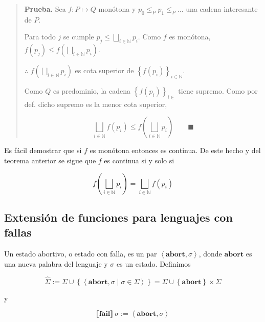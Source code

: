 \documentclass[article, 12pt]{article}
\begin{document}
\small
\begin{quote}

\textbf{Prueba.} Sea $f : P \mapsto Q$ monótona y $p_0 \leq_P p_1 \leq_P \ldots$
una cadena interesante de $P$.  

Para todo $j$ se cumple $p_j \leq \bigsqcup_{i \in \mathbb{N}} p_i$. Como $f$ es
monótona, $f(p_j) \leq f\left( \bigsqcup_{i \in \mathbb{N}} p_i \right) $. 

$\therefore $ $f\left( \bigsqcup_{i \in \mathbb{N}} p_i \right) $ es cota
superior de $\left\{ f(p_i) \right\}_{i \in \mathbb{N}} $.

Como $Q$ es predominio, la cadena $\left\{ f(p_i) \right\}_{i \in \mathbb{}} $
tiene supremo. Como por def. dicho supremo es la menor cota superior,

\begin{equation*}
  \bigsqcup_{i \in \mathbb{N}} f(p_i) \leq f \left( \bigsqcup_{i \in \mathbb{N}}
  p_i\right) \qquad \blacksquare
\end{equation*}



\end{quote}
\normalsize

Es fácil demostrar que si $f$ es monótona entonces es continua. De este hecho y
del teorema anterior se sigue que $f$ es continua si y solo si 

\begin{equation*}
  f\left( \bigsqcup_{i \in \mathbb{N}} p_i \right) = \bigsqcup_{i \in
  \mathbb{N}} f(p_i)
\end{equation*}


\subsection{Extensión de funciones para lenguajes con fallas}

Un estado abortivo, o estado con falla, es un par $\left<\textbf{abort}, \sigma
\right>$, donde $\textbf{abort}$ es una nueva palabra del lenguaje y $\sigma$
es un estado. Definimos

\begin{equation*}
  \hat{ \Sigma }  := \Sigma \cup \left\{ \left<\textbf{abort}, \sigma \mid
  \sigma \in \Sigma\right> \right\} = \Sigma \cup  \left\{ \textbf{abort}
  \right\}  \times \Sigma
\end{equation*}

y

\begin{equation*}
  \llbracket \textbf{fail} \rrbracket ~ \sigma := \left<\textbf{abort}, \sigma \right>
\end{equation*}
\end{document}
